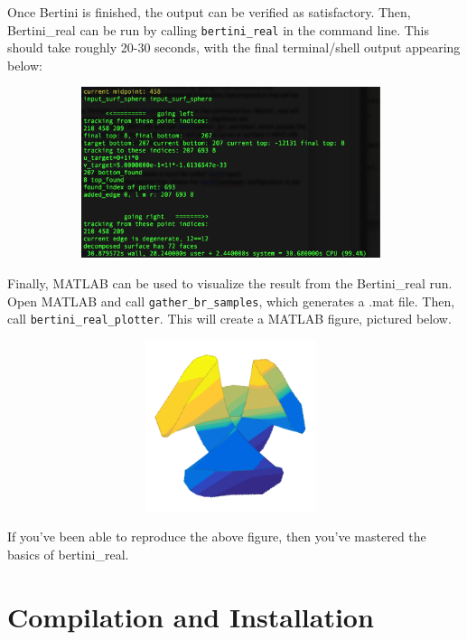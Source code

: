 \documentclass[10pt]{article}
\begin{document}
Once Bertini is finished, the output can be verified as satisfactory. Then, Bertini\_real can be run by calling \texttt{bertini\_real} in the command line. This should take roughly 20-30 seconds, with the final terminal/shell output appearing below:
\begin{figure}[!hb]
	\includegraphics[width = 11cm, height = 5cm]{CayleyCubicBertiniRealRun.png}
\end{figure}

Finally, MATLAB can be used to visualize the result from the Bertini\_real run. Open MATLAB and call \texttt{gather\_br\_samples}, which generates a .mat file. Then, call \texttt{bertini\_real\_plotter}. This will create a MATLAB figure, pictured below. 

\begin{figure}[!hb]
	\includegraphics[width = 11cm, height = 5cm]{CayleyCubic.png}
\end{figure}

If you've been able to reproduce the above figure, then you've mastered the basics of bertini\_real. 

\section{Compilation and Installation}
\label{sec:installation}
\end{document}
